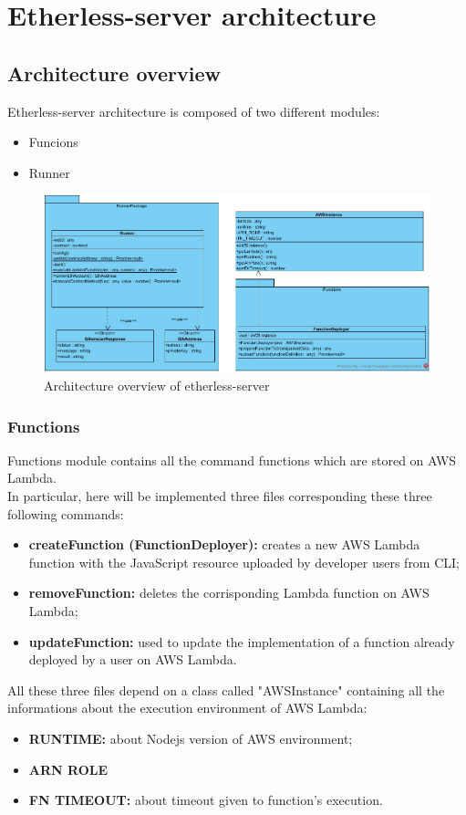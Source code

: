 \section{Etherless-server architecture}
\subsection{Architecture overview}
Etherless-server architecture is composed of two different modules:
\begin{itemize}
	\item Funcions
	\item Runner
\end{itemize}
\begin{figure}[!h]
\centering
	\includegraphics[width=\textwidth]{res/img/etherlessServer.jpg}
	\caption{Architecture overview of etherless-server}
\end{figure}
\subsubsection{Functions}
Functions module contains all the command functions which are stored on AWS Lambda. \\
In particular, here will be implemented three files corresponding these three following commands:
\begin{itemize}
	\item \textbf{createFunction (FunctionDeployer):} creates a new AWS Lambda function with the JavaScript resource uploaded by developer users from CLI;
	\item \textbf{removeFunction:} deletes the corrisponding Lambda function on AWS Lambda;
	\item \textbf{updateFunction:} used to update the implementation of a function already deployed by a user on AWS Lambda.
\end{itemize}
All these three files depend on a class called "AWSInstance" containing all the informations about the execution environment of AWS Lambda:
\begin{itemize}
	\item \textbf{RUNTIME:} about Nodejs version of AWS environment;
	\item \textbf{ARN ROLE}
	\item \textbf{FN TIMEOUT:} about timeout given to function's execution.
\end{itemize}

